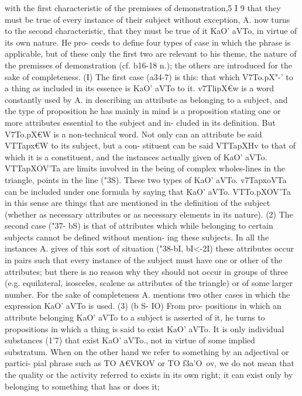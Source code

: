 {{{{with the first characteristic of the premisses of demonstration,5 I 9
that they must be true of every instance of their subject without
exception, A. now turns to the second characteristic, that they
must be true of it KaO' aVTo, in virtue of its own nature. He pro-
ceeds to define four types of case in which the phrase is applicable,
but of these only the first two are relevant to his theme, the
nature of the premisses of demonstration (cf. b16-18 n.); the
others are introduced for the sake of completeness. (I) The first
case (a34-7) is this: that which V7To.pX"-' to a thing as included in
its essence is KaO' aVTo to it. v7TlipX€w is a word constantly used
by A. in describing an attribute as belonging to a subject, and
the type of proposition he has mainly in mind is a proposition
stating one or more attributes essential to the subject and in-
cluded in its definition. But V7To.pX€W is a non-technical word. Not
only can an attribute be said VTTapx€W to its subject, but a con-
stituent can be said VTTapXHv to that of which it is a constituent,
and the instances actually given of KaO' aVTo. VTTapXOV'Ta are limits
involved in the being of complex wholes-lines in the triangle,
points in the line ("3S). These two types of KaO' aVTo. v7TapxoVTa
can be included under one formula by saying that KaO' aVTo.
VTTo.pXOV'Ta in this sense are things that are mentioned in the
definition of the subject (whether as necessary attributes or as
necessary elements in its nature).
(2) The second case ("37- bS) is that of attributes which while
belonging to certain subjects cannot be defined without mention-
ing these subjects. In all the instances A. gives of this sort of
situation ("38-bI, bI<}-2I) these attributes occur in pairs such that
every instance of the subject must have one or other of the
attributes; but there is no reason why they should not occur in
groups of three (e.g. equilateral, isosceles, scalene as attributes
of the triangle) or of some larger number.
For the sake of completeness A. mentions two other cases
in which the expression KaO' aVTo is used. (3) (b S- IO) From pro-
positions in which an attribute belonging KaO' aVTo to a subject
is asserted of it, he turns to propositions in which a thing is said
to exist KaO' aVTo. It is only individual substances (1'7) that exist
KaO' aVTo., not in virtue of some implied substratum. When on
the other hand we refer to something by an adjectival or partici-
pial phrase such as TO A€VKOV or TO f3a'O{~ov, we do not mean that
the quality or the activity referred to exists in its own right; it
can exist only by belonging to something that has or does it;
}}}}
